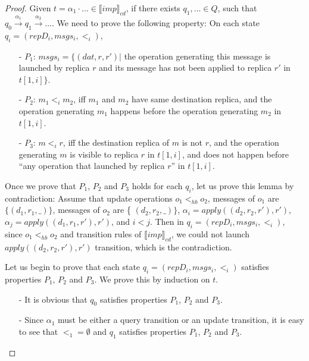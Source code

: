 \begin {proof}

Given $t = \alpha_1 \cdot \ldots \in \llbracket imp \rrbracket_{cd}$, if there exists $q_1,\ldots \in Q$, such that $q_0 {\xrightarrow{\alpha_1}} q_1 {\xrightarrow{\alpha_2}} \ldots$. We need to prove the following property: On each state $q_i=(repD_i,msgs_i,<_i)$,

\begin{itemize}
\setlength{\itemsep}{0.5pt}
\item[-] $P_1$: $msgs_i = \{ (dat,r,r') \vert$ the operation generating this message is launched by replica $r$ and its message has not been applied to replica $r'$ in $t[1,i]\}$.

\item[-] $P_2$: $m_1 <_i m_2$, iff $m_1$ and $m_2$ have same destination replica, and the operation generating $m_1$ happens before the operation generating $m_2$ in $t[1,i]$.

\item[-] $P_3$: $m <_i r$, iff the destination replica of $m$ is not $r$, and the operation generating $m$ is visible to replica $r$ in $t[1,i]$, and does not happen before ``any operation that launched by replica $r$'' in $t[1,i]$.
\end{itemize}

Once we prove that $P_1$, $P_2$ and $P_3$ holds for each $q_i$, let us prove this lemma by contradiction: Assume that update operations $o_1 <_{hb} o_2$, messages of $o_1$ are $\{ (d_1,r_1,\_) \}$, messages of $o_2$ are \{ $(d_2,r_2,\_) \}$, $\alpha_i = apply((d_2,r_2,r'),r')$, $\alpha_j = apply((d_1,r_1,r'),r')$, and $i<j$. Then in $q_i=(repD_i,msgs_i,<_i)$, since $o_1 <_{hb} o_2$ and transition rules of $\llbracket imp \rrbracket_{cd}$, we could not launch $apply((d_2,r_2,r'),r')$ transition, which is the contradiction.



Let us begin to prove that each state $q_i=(repD_i,msgs_i,<_i)$ satisfies properties $P_1$, $P_2$ and $P_3$. We prove this by induction on $t$.

\begin{itemize}
\setlength{\itemsep}{0.5pt}
\item[-] It is obvious that $q_0$ satisfies properties $P_1$, $P_2$ and $P_3$.

\item[-] Since $\alpha_1$ must be either a query transition or an update transition, it is easy to see that $<_1 = \emptyset$ and $q_1$ satisfies properties $P_1$, $P_2$ and $P_3$.


\end{itemize}
\end{proof}
